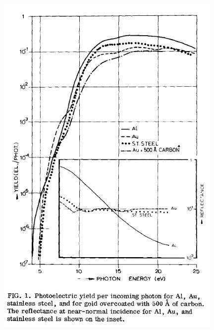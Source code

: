 \begin{figure}
\centering
\includegraphics[]{Figures/Ch9/ReflectSS.jpg}

\caption{\cite{Feuerbacher1972}}
\label{fig: PhotoElectric Reflect SS}
\end{figure}
